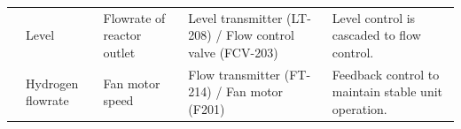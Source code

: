 \begin{table}[h]
{\begin{tabular}{p{3cm}|p{3cm}|p{4cm}|p{5cm}|p{6cm}}
                                            & Level                                       & Flowrate of reactor outlet                              & Level transmitter (LT-208) / Flow control valve (FCV-203)                  & Level control is cascaded to flow control.                                                                                           \\
                                                                                        & Hydrogen flowrate                                     & Fan motor speed                              & Flow transmitter (FT-214) / Fan motor (F201)                  & Feedback control to maintain stable unit operation.                                                                                           \\
                                                                   

\end{tabular}}
\end{table}
